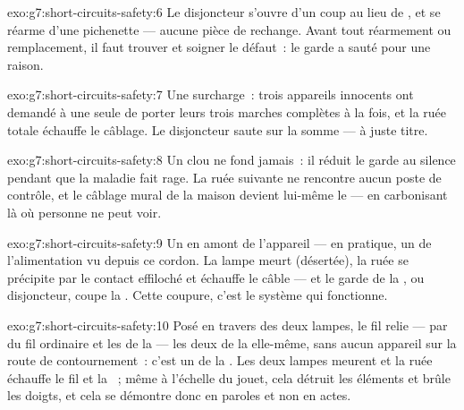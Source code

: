\begin{solution}{exo:g7:short-circuits-safety:6}
Le disjoncteur s'ouvre d'un coup au lieu de , et se réarme
d'une pichenette --- aucune pièce de rechange. Avant tout réarmement
ou remplacement, il faut trouver et soigner le défaut~: le garde a
sauté pour une raison.
\end{solution}

\begin{solution}{exo:g7:short-circuits-safety:7}
Une surcharge~: trois appareils innocents ont demandé à une seule
 de porter leurs trois marches complètes à la fois, et la ruée
totale échauffe le câblage. Le disjoncteur saute sur la somme --- à
juste titre.
\end{solution}

\begin{solution}{exo:g7:short-circuits-safety:8}
Un clou ne fond jamais~: il réduit le garde au silence pendant que la
maladie fait rage. La ruée suivante ne rencontre aucun poste de
contrôle, et le câblage mural de la maison devient lui-même le
 --- en carbonisant là où personne ne peut voir.
\end{solution}

\begin{solution}{exo:g7:short-circuits-safety:9}
Un  en amont de l'appareil --- en pratique, un
 de l'alimentation vu depuis ce cordon. La lampe meurt
(désertée), la ruée se précipite par le contact effiloché et échauffe
le câble --- et le garde de la ,  ou disjoncteur, coupe
la . Cette coupure, c'est le système qui fonctionne.
\end{solution}

\begin{solution}{exo:g7:short-circuits-safety:10}
Posé en travers des deux lampes, le fil relie --- par du fil ordinaire
et les  de la  --- les deux  de la 
elle-même, sans aucun appareil sur la route de contournement~: c'est
un  de la . Les deux lampes meurent et la ruée
échauffe le fil et la ~; même à l'échelle du jouet, cela détruit
les éléments et brûle les doigts, et cela se démontre donc en paroles
et non en actes.
\end{solution}

